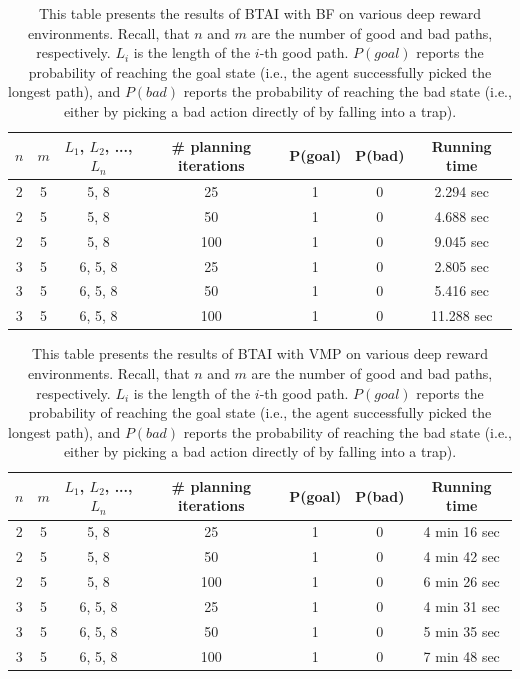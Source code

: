 \documentclass[twoside,11pt]{article}
\begin{document}
\begin{table}[H]
\centering
\begin{tabular}{ |c|c|c|c|c|c|c| }
 \hline
 $n$ & $m$ & $L_1$, $L_2$, ..., $L_n$  & \# planning iterations & P(goal) & P(bad) & Running time\\
 \hline
 2 & 5 & 5, 8 & 25 & 1 & 0 & 2.294 sec\\
 \hline
 2 & 5 & 5, 8 & 50 & 1 & 0 & 4.688 sec\\
 \hline
 2 & 5 & 5, 8 & 100 & 1 & 0 & 9.045 sec\\
 \hline
 3 & 5 & 6, 5, 8 & 25 & 1 & 0 & 2.805 sec\\
 \hline
 3 & 5 & 6, 5, 8 & 50 & 1 & 0 & 5.416 sec\\
 \hline
 3 & 5 & 6, 5, 8 & 100 & 1 & 0 & 11.288 sec\\
 \hline
\end{tabular}
\caption{This table presents the results of BTAI with BF on various deep reward environments. Recall, that $n$ and $m$ are the number of good and bad paths, respectively. $L_i$ is the length of the $i$-th good path. $P(goal)$ reports the probability of reaching the goal state (i.e., the agent successfully picked the longest path), and $P(bad)$ reports the probability of reaching the bad state (i.e., either by picking a bad action directly of by falling into a trap).}
\label{tab:1}
\end{table}

\begin{table}[H]
\centering
\begin{tabular}{ |c|c|c|c|c|c|c| }
 \hline
 $n$ & $m$ & $L_1$, $L_2$, ..., $L_n$  & \# planning iterations & P(goal) & P(bad) & Running time\\
 \hline
 2 & 5 & 5, 8 & 25 & 1 & 0 & 4 min 16 sec\\
 \hline
 2 & 5 & 5, 8 & 50 & 1 & 0 & 4 min 42 sec\\
 \hline
 2 & 5 & 5, 8 & 100 & 1 & 0 & 6 min 26 sec\\
 \hline
 3 & 5 & 6, 5, 8 & 25 & 1 & 0 & 4 min 31 sec\\
 \hline
 3 & 5 & 6, 5, 8 & 50 & 1 & 0 & 5 min 35 sec\\
 \hline
 3 & 5 & 6, 5, 8 & 100 & 1 & 0 & 7 min 48 sec\\
 \hline
\end{tabular}
\caption{This table presents the results of BTAI with VMP on various deep reward environments. Recall, that $n$ and $m$ are the number of good and bad paths, respectively. $L_i$ is the length of the $i$-th good path. $P(goal)$ reports the probability of reaching the goal state (i.e., the agent successfully picked the longest path), and $P(bad)$ reports the probability of reaching the bad state (i.e., either by picking a bad action directly of by falling into a trap).}
\label{tab:2}
\end{table}
\end{document}

